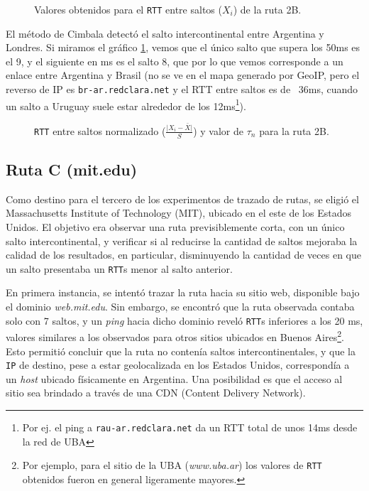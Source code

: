 \begin{figure}[H]
    \caption{Valores obtenidos para el \texttt{RTT} entre saltos ($X_i$) de la ruta 2B.}
    \label{res:escb2:rtt}
\end{figure}

El método de Cimbala detectó el salto intercontinental entre Argentina y Londres. Si miramos el gráfico \ref{res:escb2:rtt}, vemos que el único salto que supera los 50ms es el 9, y el siguiente en ms es el salto 8, que por lo que vemos corresponde a un enlace entre Argentina y Brasil (no se ve en el mapa generado por GeoIP, pero el reverso de IP es \texttt{br-ar.redclara.net} y el RTT entre saltos es de ~36ms, cuando un salto a Uruguay suele estar alrededor de los 12ms\footnote{Por ej. el ping a \texttt{rau-ar.redclara.net} da un RTT total de unos 14ms desde la red de UBA}).

\begin{figure}[H]
    \caption{\texttt{RTT} entre saltos normalizado ($\frac{\vert X_i-\bar{X}\vert}{S}$)
    y valor de $\tau_n$ para la ruta 2B.}
    \label{res:escb2:rttnorm}
\end{figure}

\subsection{Ruta C (mit.edu)}

Como destino para el tercero de los experimentos de trazado de rutas, se
eligió el Massachusetts Institute of Technology (MIT), ubicado en el este de
los Estados Unidos. El objetivo era observar una ruta previsiblemente corta,
con un único salto intercontinental, y verificar si al reducirse la cantidad
de saltos mejoraba la calidad de los resultados, en particular, disminuyendo
la cantidad de veces en que un salto presentaba un \texttt{RTT}s menor al
salto anterior.

En primera instancia, se intentó trazar la ruta hacia su
sitio web, disponible bajo el dominio \emph{web.mit.edu}. Sin embargo, se
encontró que la ruta observada contaba solo con 7 saltos, y un \emph{ping}
hacia dicho dominio reveló \texttt{RTT}s inferiores a los 20 ms, valores
similares a los observados para otros sitios ubicados en Buenos
Aires\footnote{Por ejemplo, para el sitio de la UBA (\emph{www.uba.ar}) los
valores de \texttt{RTT} obtenidos fueron en general ligeramente mayores.}.
Esto permitió concluir que la ruta no contenía saltos intercontinentales, y
que la \texttt{IP} de destino, pese a estar geolocalizada en los Estados
Unidos, correspondía a un \emph{host} ubicado físicamente en Argentina. Una
posibilidad es que el acceso al sitio sea brindado a través de una CDN
(Content Delivery Network).

